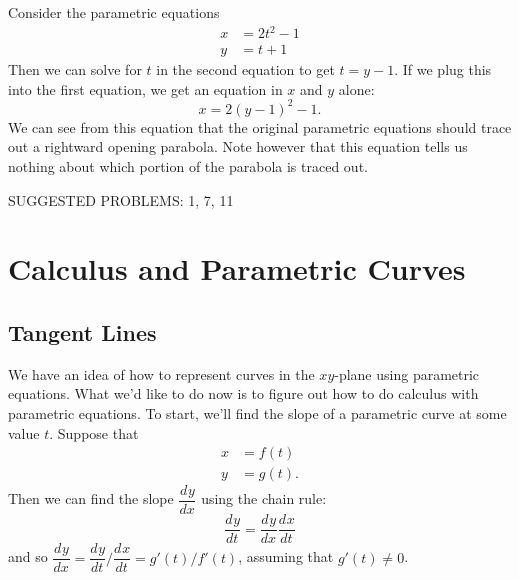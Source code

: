 \documentclass[10pt,]{book}
\theoremstyle{ptxplainnotitle}
\theoremstyle{ptxplaintitle}
\theoremstyle{ptxplainnotitle}
\theoremstyle{ptxplaintitle}
\theoremstyle{ptxplainnotitle}
\theoremstyle{ptxplaintitle}
\theoremstyle{ptxdefinitionnotitle}
\theoremstyle{ptxdefinitiontitle}
\theoremstyle{ptxdefinitionnotitle}
\theoremstyle{ptxdefinitiontitle}
\theoremstyle{ptxdefinitionnotitle}
\theoremstyle{ptxdefinitiontitle}
\theoremstyle{ptxdefinitionnotitle}
\theoremstyle{ptxdefinitiontitle}
\theoremstyle{ptxdefinitionnotitle}
\theoremstyle{ptxdefinitiontitle}
\numberwithin{equation}{section}
\newcommand{\dv}[3][]{\dfrac{d^{#1} #2}{d #3^{#1}}}
\begin{document}
\begin{example}\label{example-eliminating-parameters}
\hypertarget{p-655}{}%
Consider the parametric equations%
%
\begin{align*}
x & = 2t^{2}-1 \\
y & = t+1 
\end{align*}
\hypertarget{p-656}{}%
Then we can solve for \(t\) in the second equation to get \(t = y-1\). If we plug this into the first equation, we get an equation in \(x\) and \(y\) alone:%
%
\begin{equation*}
x = 2(y-1)^{2}-1.
\end{equation*}
\hypertarget{p-657}{}%
We can see from this equation that the original parametric equations should trace out a rightward opening parabola. Note however that this equation tells us nothing about which portion of the parabola is traced out.%
\end{example}
\hypertarget{p-658}{}%
SUGGESTED PROBLEMS: 1, 7, 11%
\typeout{************************************************}
\typeout{************************************************}
\section[{Calculus and Parametric Curves}]{Calculus and Parametric Curves}\label{section-calculus-and-parametric-curves}
\typeout{************************************************}
\typeout{************************************************}
\subsection[{Tangent Lines}]{Tangent Lines}\label{subsection-tangent-lines}
\hypertarget{p-659}{}%
We have an idea of how to represent curves in the \(xy\)-plane using parametric equations. What we'd like to do now is to figure out how to do calculus with parametric equations. To start, we'll find the slope of a parametric curve at some value \(t\). Suppose that%
%
\begin{align*}
x & = f(t) \\
y & = g(t). 
\end{align*}
\hypertarget{p-660}{}%
Then we can find the slope \(\dv{y}{x}\) using the chain rule:%
%
\begin{equation*}
\dv{y}{t} = \dv{y}{x}\dv{x}{t}
\end{equation*}
\hypertarget{p-661}{}%
and so \(\dv{y}{x} = \dv{y}{t}/\dv{x}{t} = g'(t)/f'(t)\), assuming that \(g'(t)\neq0\).%
\typeout{************************************************}
\typeout{************************************************}
\end{document}
